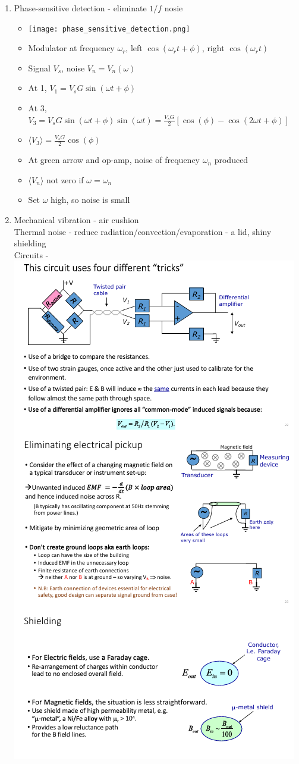 \documentclass{article}
\theoremstyle{remark}
\theoremstyle{remark}
\begin{document}
\begin{enumerate}
    \item Phase-sensitive detection - eliminate $1/f$ nosie\begin{itemize}
            \item \texttt{[image: phase\_sensitive\_detection.png]}
            \item Modulator at frequency $\omega_r$, left $\cos(\omega_r t+\phi)$, right $\cos(\omega_r t)$
            \item Signal $V_s$, noise $V_n=V_n(\omega)$
            \item At 1, $V_1=V_s G\sin(\omega t+\phi)$
            \item At 3, $V_3=V_s G\sin(\omega t+\phi)\sin(\omega t)=\frac{V_s G}{2}[\cos(\phi)-\cos(2\omega t+\phi)]$
            \item $\langle V_3\rangle=\frac{V_s G}{2}\cos(\phi)$
            \item At green arrow and op-amp, noise of frequency $\omega_n$ produced
            \item $\langle V_n\rangle$ not zero if $\omega=\omega_n$
            \item Set $\omega$ high, so noise is small
        \end{itemize}
    \item Mechanical vibration - air cushion\\
        Thermal noise - reduce radiation/convection/evaporation - a lid, shiny shielding\\
        Circuits - \includegraphics*[width=0.6\linewidth]{circuits.png}

\end{enumerate}
\end{document}
